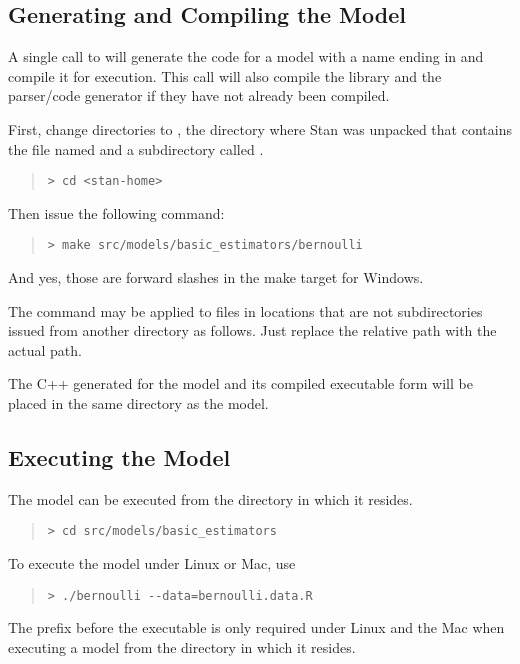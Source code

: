 \subsection{Generating and Compiling the Model}

A single call to  will generate the \Cpp code for a
model with a name ending in  and compile it for
execution.  This call will also compile the library 
and the parser/code generator  if they have not already
been compiled.

First, change directories to , the directory where
Stan was unpacked that contains the file named  and
a subdirectory called .
%
\begin{quote}
\begin{Verbatim}[fontshape=sl]
> cd <stan-home>
\end{Verbatim}
\end{quote}
%
Then issue the following command:
%
\begin{quote}
\begin{Verbatim}[fontshape=sl]
> make src/models/basic_estimators/bernoulli 
\end{Verbatim}
\end{quote}
And yes, those are forward slashes in the make target for Windows.

The  command may be applied to files in locations
that are not subdirectories issued from another directory as follows.
Just replace the relative path  with the
actual path.

The C++ generated for the model and its compiled executable
form will be placed in the same directory as the model.


\subsection{Executing the Model}

The model can be executed from the directory in which it resides.
%
\begin{quote}
\begin{Verbatim}[fontshape=sl]
> cd src/models/basic_estimators 
\end{Verbatim}
\end{quote}
%
To execute the model under Linux or Mac, use
%
\begin{quote}
\begin{Verbatim}[fontshape=sl]
> ./bernoulli --data=bernoulli.data.R
\end{Verbatim}
\end{quote}
%
The  prefix before the executable is only required under
Linux and the Mac when executing a model from the directory in which
it resides.

